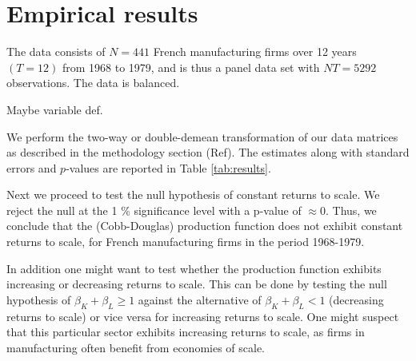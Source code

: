 \section{Empirical results}

The data consists of $N = 441$ French manufacturing firms over 12 years $(T=12)$ from 1968 to 1979, and is thus a panel data set with $NT = 5292$ observations. The data is balanced. 

Maybe variable def. 

We perform the two-way or double-demean transformation of our data matrices as described in the methodology section (Ref). The estimates along with standard errors and $p$-values are reported in Table \ref{tab:results}. 

Next we proceed to test the null hypothesis of constant returns to scale. We reject the null at the 1 \% significance level with a p-value of $\approx 0$. Thus, we conclude that the (Cobb-Douglas) production function does not exhibit constant returns to scale, for French manufacturing firms in the period 1968-1979. 

In addition one might want to test whether the production function exhibits increasing or decreasing returns to scale. This can be done by testing the null hypothesis of $\beta_K + \beta_L \geq 1$ against the alternative of $\beta_K + \beta_L < 1$ (decreasing returns to scale) or vice versa for increasing returns to scale. One might suspect that this particular sector exhibits increasing returns to scale, as firms in manufacturing often benefit from economies of scale. 